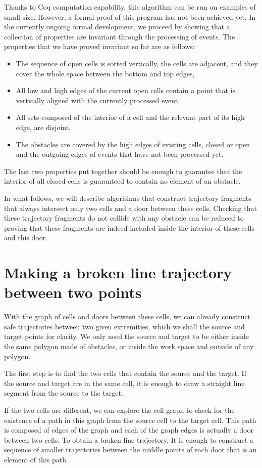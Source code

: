 \documentclass{easychair}
\begin{document}
Thanks to Coq computation capability, this algorithm can be run on
examples of small size.  However, a formal proof of this program has
not been achieved yet.  In the currently ongoing formal development, we
proceed by showing that a collection of properties are invariant
through the processing of events.  The properties that we have proved
invariant so far are as follows:
\begin{itemize}
\item The sequence of open cells is sorted vertically, the cells are
  adjacent, and they cover the whole space between the bottom and top
  edges,
\item All low and high edges of the current open cells contain a point
that is vertically aligned with the currently processed event,
\item All sets composed of the interior of a cell and the relevant
part of its high edge, are disjoint,
\item The obstacles are covered by the high edges of existing cells,
  closed or open and the outgoing edges of events that have not been
  processed yet.
\end{itemize}
The last two properties put together should be enough to guarantee
that the interior of all closed cells is guaranteed to contain no
element of an obstacle.

In what follows, we will describe algorithms that
construct trajectory fragments that always
intersect only two cells and a door between these cells.
Checking that these trajectory fragments do not collide with any
obstacle can be reduced to proving that these fragments are indeed
included inside the interior of these cells and this door.
\section{Making a broken line trajectory between two points}
With the graph of cells and doors between these cells, we can already
construct safe trajectories between two given extremities, which we shall
the source and target points for clarity.  We only need the source and
target to be either inside the same polygon made of obstacles, or
inside the work space and outside of any polygon.

The first step is to find the two cells that contain the source and
the target.  If the source and target are in the same cell, it is
enough to draw a straight line segment from the source to the target.

If the two cells are different, we can explore the cell graph to check for
the existence of a path in this graph from the source cell to the
target cell.  This path is composed of edges of the graph and each of
the graph edges is actually a door between two cells.  To obtain a
broken line trajectory, It is enough to
construct a sequence of smaller trajectories between the middle points
of each door that is an element of this path.
\end{document}
